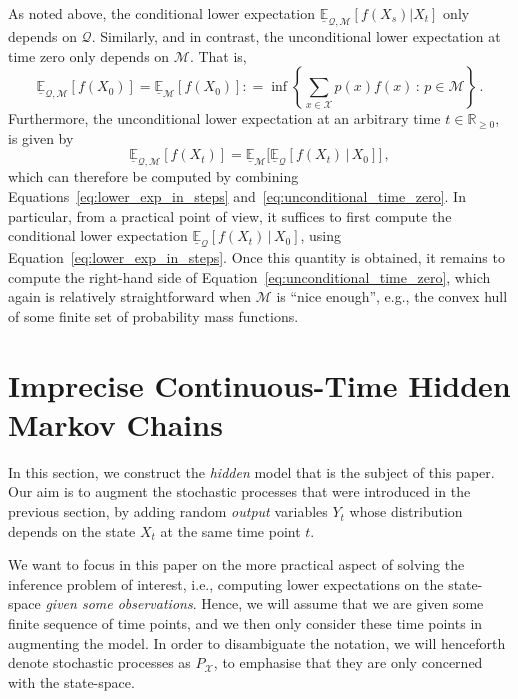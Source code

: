\documentclass[twoside,11pt]{article}
\newcommand{\reals}{\mathbb{R}}
\newcommand{\realsnonneg}{\reals_{\geq 0}}
\newcommand{\states}{\mathcal{X}}
\newcommand{\lexp}{\underline{\mathbb{E}}_{\rateset,\mathcal{M}}}
\newcommand{\rateset}{\mathcal{Q}}
\newcommand{\coloneqq}{:\!=}
\begin{document}
As noted above, the conditional lower expectation $\lexp[f(X_s)\vert X_t]$ only depends on $\rateset$. Similarly, and in contrast, the unconditional lower expectation at time zero only depends on $\mathcal{M}$. That is,
\begin{equation}\label{eq:unconditional_time_zero}
\lexp[f(X_0)] = \underline{\mathbb{E}}_{\mathcal{M}}[f(X_0)] \coloneqq \inf\left\{ \sum_{x\in\states}p(x)f(x)\,:\,p\in\mathcal{M} \right\}\,.
\end{equation}
Furthermore, the unconditional lower expectation at an arbitrary time $t\in\realsnonneg$, is given by
\begin{equation}\label{eq:unconditional_lower_exp}
\underline{\mathbb{E}}_{\rateset,\mathcal{M}}[f(X_t)] = \underline{\mathbb{E}}_{\mathcal{M}}\bigl[\underline{\mathbb{E}}_{\rateset}[f(X_t)\,\vert\,X_0]\bigr]\,,
\end{equation}
which can therefore be computed by combining Equations~\eqref{eq:lower_exp_in_steps} and~\eqref{eq:unconditional_time_zero}. In particular, from a practical point of view, it suffices to first compute the conditional lower expectation $\underline{\mathbb{E}}_{\rateset}[f(X_t)\,\vert\,X_0]$, using Equation~\eqref{eq:lower_exp_in_steps}. Once this quantity is obtained, it remains to compute the right-hand side of Equation~\eqref{eq:unconditional_time_zero}, which again is relatively straightforward when $\mathcal{M}$ is ``nice enough'', e.g., the convex hull of some finite set of probability mass functions.

\section{Imprecise Continuous-Time Hidden Markov Chains}\label{sec:icthmc}

In this section, we construct the \emph{hidden} model that is the subject of this paper. Our aim is to augment the stochastic processes that were introduced in the previous section, by adding random \emph{output} variables $Y_t$ whose distribution depends on the state $X_t$ at the same time point $t$.



We want to focus in this paper on the more practical aspect of solving the inference problem of interest, i.e., computing lower expectations on the state-space \emph{given some observations}.
Hence, we will assume that we are given some finite sequence of time points, and we then only consider these time points in augmenting the model. 
In order to disambiguate the notation, we will henceforth denote stochastic processes as $P_\states$, to emphasise that they are only concerned with the state-space.
\vspace{-4pt}
\end{document}

